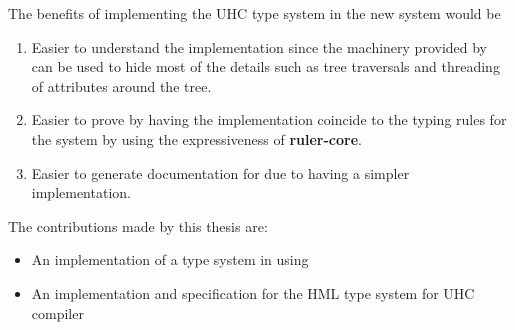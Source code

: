 The benefits of implementing the UHC type system in the new \rcore system would be

\begin{enumerate}
\item Easier to understand the implementation since the machinery provided by \ags can be used to hide most of the details such as tree traversals and threading of attributes around the tree.
\item Easier to prove by having the implementation coincide to the typing rules for the system by using the expressiveness of \textbf{ruler-core}.
\item Easier to generate documentation for due to having a simpler implementation.
\end{enumerate}

The contributions made by this thesis are:
\begin{itemize}
\item An implementation of a type system in \ags using \rcore
\item An implementation and specification for the HML type system for UHC compiler
\end{itemize}
